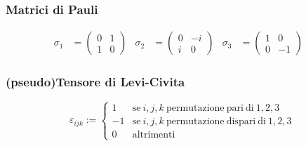 \subsubsection{Matrici di Pauli}
\begin{equation}\label{eq:paulimatrix}
   \begin{aligned}
      \sigma_1 &= \begin{pmatrix} 0 & 1  \\ 1 & 0  \end{pmatrix}&
      \sigma_2 &= \begin{pmatrix} 0 & -i \\ i & 0  \end{pmatrix}&
      \sigma_3 &= \begin{pmatrix} 1 & 0  \\ 0 & -1 \end{pmatrix}&
   \end{aligned}
\end{equation}
\subsubsection{(pseudo)Tensore di Levi-Civita}
$$
   \varepsilon_{ijk} := \begin{cases}
      1  & \mathrm{se \:} i,j,k \mathrm{\: permutazione \:   pari \: di\:} 1,2,3 \\
      -1 & \mathrm{se \:} i,j,k \mathrm{\: permutazione \: dispari\: di\:} 1,2,3 \\
      0  & \mathrm{altrimenti}
   \end{cases}
$$
